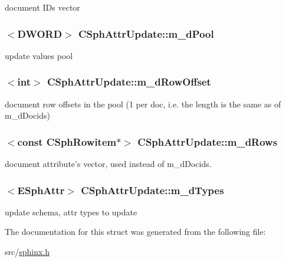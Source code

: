 document I\-Ds vector 

\hypertarget{structCSphAttrUpdate_a074812eb96b6877e46858109c08090ca}{
\subsubsection[{m\-\_\-d\-Pool}]{$<${\bf D\-W\-O\-R\-D}$>$ C\-Sph\-Attr\-Update\-::m\-\_\-d\-Pool}}\label{structCSphAttrUpdate_a074812eb96b6877e46858109c08090ca}


update values pool 

\hypertarget{structCSphAttrUpdate_ac82102723b4c90f12d6b05f44105d51e}{
\subsubsection[{m\-\_\-d\-Row\-Offset}]{$<${\bf int}$>$ C\-Sph\-Attr\-Update\-::m\-\_\-d\-Row\-Offset}}\label{structCSphAttrUpdate_ac82102723b4c90f12d6b05f44105d51e}


document row offsets in the pool (1 per doc, i.\-e. the length is the same as of m\-\_\-d\-Docids) 

\hypertarget{structCSphAttrUpdate_af109ebce3bcb683624821fef41f430e3}{
\subsubsection[{m\-\_\-d\-Rows}]{$<$const {\bf C\-Sph\-Rowitem}$\ast$$>$ C\-Sph\-Attr\-Update\-::m\-\_\-d\-Rows}}\label{structCSphAttrUpdate_af109ebce3bcb683624821fef41f430e3}


document attribute's vector, used instead of m\-\_\-d\-Docids. 

\hypertarget{structCSphAttrUpdate_ae07327b4cd589b53e96bf2e0661dbf7f}{
\subsubsection[{m\-\_\-d\-Types}]{$<${\bf E\-Sph\-Attr}$>$ C\-Sph\-Attr\-Update\-::m\-\_\-d\-Types}}\label{structCSphAttrUpdate_ae07327b4cd589b53e96bf2e0661dbf7f}


update schema, attr types to update 



The documentation for this struct was generated from the following file\-:\begin{DoxyCompactItemize}
\item 
src/\hyperlink{sphinx_8h}{sphinx.\-h}\end{DoxyCompactItemize}

